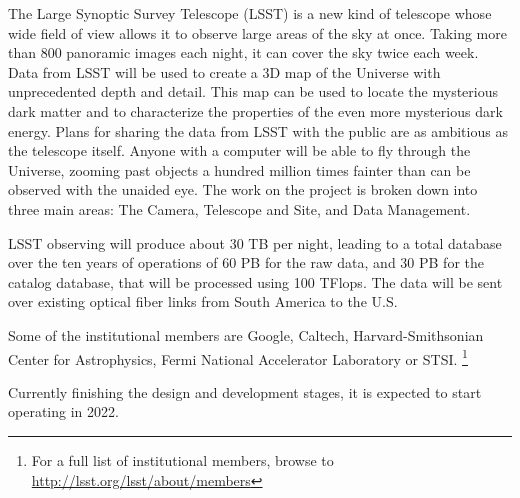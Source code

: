 The Large Synoptic Survey Telescope (LSST) is a new kind of telescope whose wide field of view allows it to observe large areas of the sky at once. Taking more than 800 panoramic images each night, it can cover the sky twice each week. Data from LSST will be used to create a 3D map of the Universe with unprecedented depth and detail. This map can be used to locate the mysterious dark matter and to characterize the properties of the even more mysterious dark energy. Plans for sharing the data from LSST with the public are as ambitious as the telescope itself. Anyone with a computer will be able to fly through the Universe, zooming past objects a hundred million times fainter than can be observed with the unaided eye. The work on the project is broken down into three main areas: The Camera, Telescope and Site, and Data Management. \newline

LSST observing will produce about 30 TB per night, leading to a total database over the ten years of operations of 60 PB for the raw data, and 30 PB for the catalog database, that will be processed using 100 TFlops. The data will be sent over existing optical fiber links from South America to the U.S. \newline

Some of the institutional members are Google, Caltech, Harvard-Smithsonian Center for Astrophysics, Fermi National Accelerator Laboratory or STSI. \footnote{For a full list of institutional members, browse to \url{http://lsst.org/lsst/about/members}}  \newline

Currently finishing the design and development stages, it is expected to start operating in 2022.